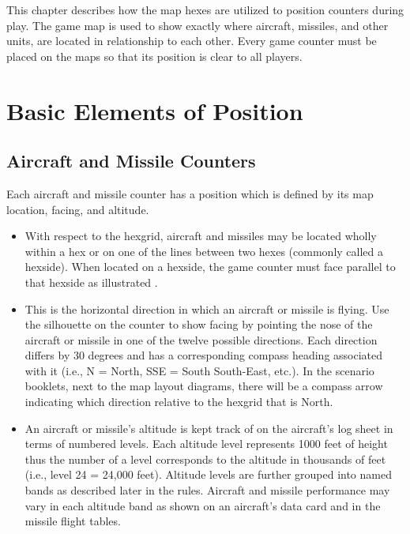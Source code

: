 

This chapter describes how the map hexes are utilized to position counters during play. The game map is used to show exactly where aircraft, missiles, and other units, are located in relationship to each other. Every game counter must be placed on the maps so that its position is clear to all players.

\section{Basic Elements of Position}
\label{rule:position}

\subsection{Aircraft and Missile Counters}
Each aircraft and missile counter has a position which is defined by its map location, facing, and altitude.

\begin{itemize}
    \item {} With respect to the hexgrid, aircraft and missiles may be located wholly within a hex or on one of the lines between two hexes (commonly called a hexside). When located on a hexside, the game counter must face parallel to that hexside as illustrated . 

    \item {} This is the horizontal direction in which an aircraft or missile is flying. Use the silhouette on the counter to show facing by pointing the nose of the aircraft or missile in one of the twelve possible directions. Each direction differs by 30 degrees and has a corresponding compass heading associated with it (i.e., N = North, SSE = South South-East, etc.). In the scenario booklets, next to the map layout diagrams, there will be a compass arrow indicating which direction relative to the hexgrid that is North. 

    \item {} An aircraft or missile's altitude is kept track of on the aircraft's log sheet in terms of numbered levels. Each altitude level represents 1000 feet of height thus the number of a level corresponds to the altitude in thousands of feet (i.e., level 24 = 24,000 feet). Altitude levels are further grouped into named bands as described later in the rules. Aircraft and missile performance may vary in each altitude band as shown on an aircraft's data card and in the missile flight tables.

\end{itemize}

